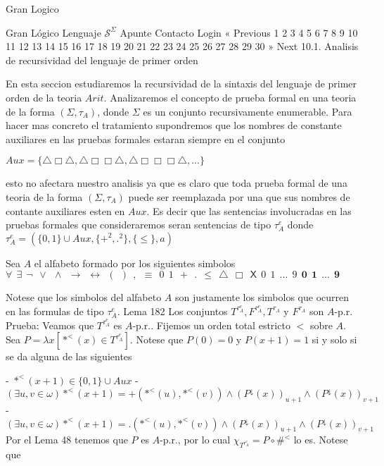 Gran Logico

Gran Lógico
Lenguaje \(\mathcal{S}^{\Sigma }\)
Apunte
Contacto
Login
« Previous
1
2
3
4
5
6
7
8
9
10
11
12
13
14
15
16
17
18
19
20
21
22
23
24
25
26
27
28
29
30
» Next
10.1. Analisis de recursividad del lenguaje de primer orden

En esta seccion estudiaremos la recursividad de la sintaxis del lenguaje de primer orden de la teoria \(Arit\). Analizaremos el concepto de prueba formal en una teoria de la forma \((\Sigma ,\tau _{A})\), donde \(\Sigma \) es un conjunto recursivamente enumerable. Para hacer mas concreto el tratamiento supondremos que los nombres de constante auxiliares en las pruebas formales estaran siempre en el conjunto

\(\displaystyle Aux=\{\triangle \Box \triangle ,\triangle \Box \Box \triangle ,\triangle \Box \Box \Box \triangle ,...\} \)

esto no afectara nuestro analisis ya que es claro que toda prueba formal de una teoria de la forma \((\Sigma ,\tau _{A})\) puede ser reemplazada por una que sus nombres de contante auxiliares esten en \(Aux\). Es decir que las sentencias involucradas en las pruebas formales que consideraremos seran sentencias de tipo \(\tau _{A}^{e}\) donde
\(\displaystyle \tau _{A}^{e}=(\{0,1\}\cup Aux,\{+^{2},.^{2}\},\{\leq \},a) \)

Sea \(A\) el alfabeto formado por los siguientes simbolos
\(\displaystyle \forall \ \ \exists \ \ \lnot \ \ \vee \ \ \wedge \ \ \rightarrow \ \ \leftrightarrow \ \ (\ \ )\ \ ,\ \ \equiv \ \ 0\ \ 1\ \ +\ \ .\ \ \leq \ \ \triangle \ \ \Box \ \ \mathsf{X}\ \ \mathit{0}\ \ \mathit{1}\ \ ...\ \ \mathit{9}\ \ \mathbf{0}\ \ \mathbf{1}\ \ ...\ \ \mathbf{9} \)

Notese que los simbolos del alfabeto \(A\) son justamente los simbolos que ocurren en las formulas de tipo \(\tau _{A}^{e}\).
Lema 182 Los conjuntos \(T^{\tau _{A}^{e}},F^{\tau _{A}^{e}},T^{\tau _{A}}\) y \(F^{\tau _{A}}\) son \(A\)-p.r.
Prueba: Veamos que \(T^{\tau _{A}^{e}}\) es \(A\)-p.r.. Fijemos un orden total estricto \( < \) sobre \(A\). Sea \(P=\lambda x[\ast ^{< }(x)\in T^{\tau _{A}^{e}}]\). Notese que \(P(0)=0\) y \(P(x+1)=1\) si y solo si se da alguna de las siguientes

- \(\ast ^{< }(x+1)\in \{0,1\}\cup Aux\)
- \((\exists u,v\in \omega )\ast ^{< }(x+1)=+(\mathrm{\ast }^{< }(u), \mathrm{\ast }^{< }(v))\wedge (P^{\downarrow }(x))_{u+1}\wedge (P^{\downarrow }(x))_{v+1}\)
- \((\exists u,v\in \omega )\ast ^{< }(x+1)=\mathrm{.}(\mathrm{\ast } ^{< }(u),\mathrm{\ast }^{< }(v))\wedge (P^{\downarrow }(x))_{u+1}\wedge (P^{\downarrow }(x))_{v+1}\)
Por el Lema 48 tenemos que \(P\) es \(A\)-p.r., por lo cual \(\chi _{T^{\tau _{A}^{e}}}=P\circ \#^{< }\) lo es. Notese que

